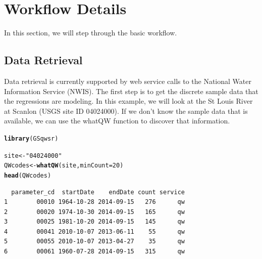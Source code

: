 \documentclass[a4paper,11pt]{article}\usepackage[]{graphicx}\usepackage[]{color}
\makeatletter
\newcommand{\hlnum}[1]{\textcolor[rgb]{0.686,0.059,0.569}{#1}}%
\newcommand{\hlstr}[1]{\textcolor[rgb]{0.192,0.494,0.8}{#1}}%
\newcommand{\hlstd}[1]{\textcolor[rgb]{0.345,0.345,0.345}{#1}}%
\newcommand{\hlkwb}[1]{\textcolor[rgb]{0.69,0.353,0.396}{#1}}%
\newcommand{\hlkwc}[1]{\textcolor[rgb]{0.333,0.667,0.333}{#1}}%
\newcommand{\hlkwd}[1]{\textcolor[rgb]{0.737,0.353,0.396}{\textbf{#1}}}%
\newenvironment{kframe}{%
 \def\at@end@of@kframe{}%
 \ifinner\ifhmode%
  \def\at@end@of@kframe{\end{minipage}}%
  \begin{minipage}{\columnwidth}%
 \fi\fi%
 \def\FrameCommand##1{\hskip\@totalleftmargin \hskip-\fboxsep
 \colorbox{shadecolor}{##1}\hskip-\fboxsep
     \hskip-\linewidth \hskip-\@totalleftmargin \hskip\columnwidth}%
 \MakeFramed {\advance\hsize-\width
   \@totalleftmargin\z@ \linewidth\hsize
   \@setminipage}}%
 {\par\unskip\endMakeFramed%
 \at@end@of@kframe}
\newenvironment{knitrout}{}{} %
\makeatother
\begin{document}
\section{Workflow Details}
\label{sec:details}
In this section, we will step through the basic workflow.

\subsection{Data Retrieval}
Data retrieval is currently supported by web service calls to the National Water Information Service (NWIS). The first step is to get the discrete sample data that the regressions are modeling. In this example, we will look at the St Louis River at Scanlon (USGS site ID 04024000). If we don't know the sample data that is available, we can use the whatQW function to discover that information. 

\begin{knitrout}
\color{fgcolor}\begin{kframe}
\begin{alltt}
\hlkwd{library}\hlstd{(GSqwsr)}
\end{alltt}
\end{kframe}
\end{knitrout}




\begin{knitrout}
\color{fgcolor}\begin{kframe}
\begin{alltt}
\hlstd{site} \hlkwb{<-} \hlstr{"04024000"}
\hlstd{QWcodes} \hlkwb{<-} \hlkwd{whatQW}\hlstd{(site,} \hlkwc{minCount}\hlstd{=}\hlnum{20}\hlstd{)}
\hlkwd{head}\hlstd{(QWcodes)}
\end{alltt}
\begin{verbatim}
  parameter_cd  startDate    endDate count service
1        00010 1964-10-28 2014-09-15   276      qw
2        00020 1974-10-30 2014-09-15   165      qw
3        00025 1981-10-20 2014-09-15   145      qw
4        00041 2010-10-07 2013-06-11    55      qw
5        00055 2010-10-07 2013-04-27    35      qw
6        00061 1960-07-28 2014-09-15   315      qw
\end{verbatim}
\end{kframe}
\end{knitrout}
\end{document}
